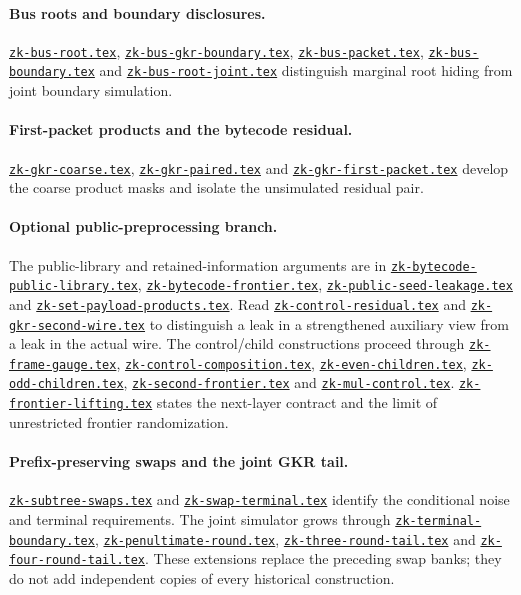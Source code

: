 \documentclass[11pt]{article}
\theoremstyle{definition}
\newcommand{\researchnote}[1]{\href{../#1.tex}{\nolinkurl{#1.tex}}}
\begin{document}
\paragraph{Bus roots and boundary disclosures.} \researchnote{zk-bus-root}, \researchnote{zk-bus-gkr-boundary}, \researchnote{zk-bus-packet}, \researchnote{zk-bus-boundary} and \researchnote{zk-bus-root-joint} distinguish marginal root hiding from joint boundary simulation.

\paragraph{First-packet products and the bytecode residual.} \researchnote{zk-gkr-coarse}, \researchnote{zk-gkr-paired} and \researchnote{zk-gkr-first-packet} develop the coarse product masks and isolate the unsimulated residual pair.

\paragraph{Optional public-preprocessing branch.} The public-library and retained-information arguments are in \researchnote{zk-bytecode-public-library}, \researchnote{zk-bytecode-frontier}, \researchnote{zk-public-seed-leakage} and \researchnote{zk-set-payload-products}. Read \researchnote{zk-control-residual} and \researchnote{zk-gkr-second-wire} to distinguish a leak in a strengthened auxiliary view from a leak in the actual wire. The control/child constructions proceed through \researchnote{zk-frame-gauge}, \researchnote{zk-control-composition}, \researchnote{zk-even-children}, \researchnote{zk-odd-children}, \researchnote{zk-second-frontier} and \researchnote{zk-mul-control}. \researchnote{zk-frontier-lifting} states the next-layer contract and the limit of unrestricted frontier randomization.

\paragraph{Prefix-preserving swaps and the joint GKR tail.} \researchnote{zk-subtree-swaps} and \researchnote{zk-swap-terminal} identify the conditional noise and terminal requirements. The joint simulator grows through \researchnote{zk-terminal-boundary}, \researchnote{zk-penultimate-round}, \researchnote{zk-three-round-tail} and \researchnote{zk-four-round-tail}. These extensions replace the preceding swap banks; they do not add independent copies of every historical construction.
\end{document}
